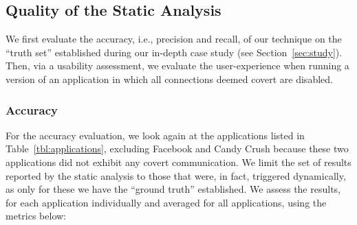 
\subsection{Quality of the Static Analysis}
We first evaluate the accuracy, i.e., precision and recall, of our technique on the ``truth set'' established during our in-depth case study (see Section~\ref{sec:study}).
Then, via a usability assessment, we evaluate the user-experience when running a version of an application in which all connections deemed covert are disabled. 

\subsubsection{Accuracy}
For the accuracy evaluation, we look again at the applications listed in 
Table~\ref{tbl:applications}, excluding Facebook and Candy Crush because these two applications  did not exhibit any covert communication. We limit the set of results reported by the static analysis to those that were, in fact, triggered dynamically, as only for these we have the ``ground truth'' established. 
We assess the results, for each application individually and averaged for all applications, using the metrics below:

